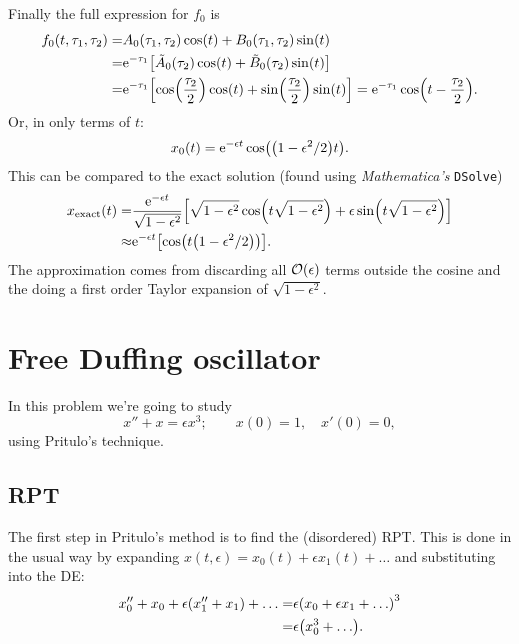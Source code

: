 \documentclass[11pt,letter, swedish, english
]{article}
\renewcommand{\thesubsection}{\arabic{section} (\alph{subsection})}
\begin{document}
Finally the full expression for $f_0$ is
\begin{equation}
\begin{aligned}
f_0(t, \tau_1, \tau_2)=&A_0(\tau_1, \tau_2)\cos(t)+B_0(\tau_1, \tau_2)\sin(t)\\
=&\mathrm{e}^{-\tau_1}
\qty[\tilde{A}_0(\tau_2)\cos(t)+\tilde{B}_0(\tau_2)\sin(t)]\\
=&\mathrm{e}^{-\tau_1}
\qty[\cos(\frac{\tau_2}{2})\cos(t)+\sin(\frac{\tau_2}{2})\sin(t)]
=\mathrm{e}^{-\tau_1}\cos(t-\frac{\tau_2}{2}).
\end{aligned}
\end{equation}
Or, in only terms of $t$:
\begin{equation}
x_0(t)=\mathrm{e}^{-\epsilon t}\cos(\qty(1-\epsilon^2/2)t).
\end{equation}
This can be compared to the exact solution (found using
\textit{Mathematica's} \texttt{DSolve}) 
\begin{equation}
\begin{aligned}
x_\text{exact}(t)=&
\frac{\mathrm{e}^{-\epsilon t}}{\sqrt{1-\epsilon^2}} \qty[
\sqrt{1-\epsilon^2}\cos(t\sqrt{1-\epsilon^2})
+\epsilon\sin(t\sqrt{1-\epsilon^2})
]\\ \approx&
\mathrm{e}^{-\epsilon t}\qty[
\cos(t\qty(1-\epsilon^2/2))
].
\end{aligned}
\end{equation}
The approximation comes from discarding all $\order{\epsilon}$ terms
outside the cosine and the doing a first order Taylor expansion of
$\sqrt{1-\epsilon^2}$. 


\section{Free Duffing oscillator}
\renewcommand{\thesubsection}{\arabic{section} (\roman{subsection})}

In this problem we're going to study
\begin{equation}
x''+x=\epsilon {x}^3;\qquad
x(0)=1,\quad {x'}(0)=0,
\end{equation}
using Pritulo's technique.

\subsection{RPT}
The first step in Pritulo's method is to find the (disordered)
RPT. This is done in the usual way by expanding 
$x(t, \epsilon)=x_0(t)+\epsilon x_1(t)+\ldots$ and
substituting into the DE:
\begin{equation}
\begin{aligned}
x_0''+x_0 + \epsilon\qty(x_1''+x_1)
+\ldots
=&\epsilon\qty(x_0+\epsilon x_1+ \ldots)^3\\
=&\epsilon\qty(x_0^3+ \ldots).
\end{aligned}
\end{equation}
\end{document}
